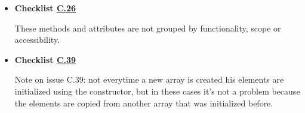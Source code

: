 \documentclass[../../../../codeInspection.tex]{subfiles}
\begin{document}
\begin{itemize}
		    \item \textbf{Checklist \hyperref[C:26]{C.26}}

		    	  

		    	  These methods and attributes are not grouped by functionality, scope or accessibility.

		    \item \textbf{Checklist \hyperref[C:39]{C.39}}

		    	  Note on issue C.39: not everytime a new array is created his elements are initialized using the constructor, but in these cases it's not a problem because the elements are copied from another array that was initialized before.

		\end{itemize}
\end{document}
